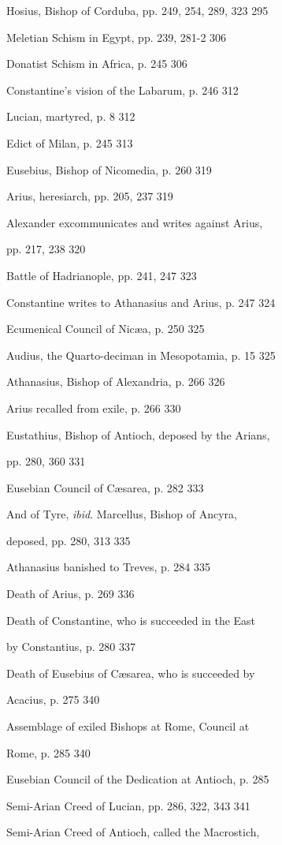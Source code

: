 Hosius, Bishop of Corduba, pp. 249, 254, 289,
323
295

Meletian Schism in Egypt, pp. 239, 281-2
306

Donatist Schism in Africa, p. 245
306

Constantine's vision of the Labarum, p. 246
312

Lucian, martyred, p. 8
312

Edict of Milan, p. 245
313

Eusebius, Bishop of Nicomedia, p. 260
319

Arius, heresiarch, pp. 205, 237
319

Alexander excommunicates and writes against
Arius,

pp. 217, 238
320

Battle of Hadrianople, pp. 241, 247
323

Constantine writes to Athanasius and Arius, p.
247
324

Ecumenical Council of Nicæa, p. 250
325

Audius, the Quarto-deciman in Mesopotamia, p.
15
325

Athanasius, Bishop of Alexandria, p. 266
326

Arius recalled from exile, p. 266
330

Eustathius, Bishop of Antioch, deposed by the
Arians, 

pp. 280, 360
331

Eusebian Council of Cæsarea, p. 282
333

And of Tyre, \emph{ibid}. Marcellus, Bishop of
Ancyra,

deposed, pp. 280, 313
335

Athanasius banished to Treves, p. 284
335

Death of Arius, p. 269
336

Death of Constantine, who is succeeded in the
East

by Constantius, p. 280
337

Death of Eusebius of Cæsarea, who is succeeded
by

Acacius, p. 275
340

Assemblage of exiled Bishops at Rome, Council
at

Rome, p. 285
340

Eusebian Council of the Dedication at Antioch,
p. 285 

Semi-Arian Creed of Lucian, pp. 286, 322,
343
341

Semi-Arian Creed of Antioch, called the
Macrostich,

